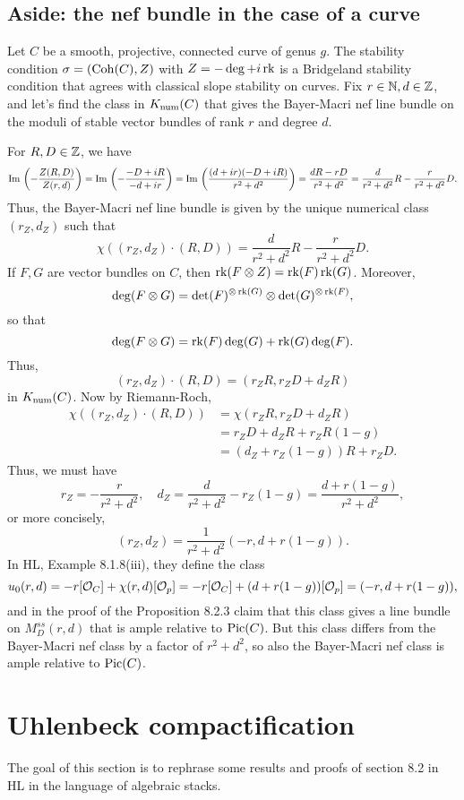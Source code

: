 \documentclass[letterpaper,10pt]{article}
\begin{document}
\subsection{Aside: the nef bundle in the case of a curve}
Let $C$ be a smooth, projective, connected curve of genus $g$. The stability condition $\sigma = (\mathrm{Coh}(C), Z)$ with $Z = -\deg + i\operatorname{\mathrm{rk}}$ is a Bridgeland stability condition that agrees with classical slope stability on curves. Fix $r \in \mathbb{N}, d \in \mathbb{Z}$, and let's find the class in $K_{\mathrm{num}}(C)$ that gives the Bayer-Macri nef line bundle on the moduli of stable vector bundles of rank $r$ and degree $d$.

For $R, D \in \mathbb{Z}$, we have
\[ \mathrm{Im}\,\left(-\frac{Z(R,D)}{Z(r,d)}\right) = \mathrm{Im}\,\left(-\frac{-D + i R}{-d + i r}\right) = \mathrm{Im}\,\left(\frac{(d + i r)(-D + i R)}{r^2 + d^2}\right) = \frac{d R - r D}{r^2 + d^2} = \frac{d}{r^2 + d^2} R - \frac{r}{r^2 + d^2} D. \]
Thus, the Bayer-Macri nef line bundle is given by the unique numerical class $(r_Z, d_Z)$ such that
\[ \chi((r_Z, d_Z) \cdot (R, D)) = \frac{d}{r^2 + d^2} R - \frac{r}{r^2 + d^2} D. \]
If $F, G$ are vector bundles on $C$, then $\operatorname{\mathrm{rk}}(F \otimes Z) = \operatorname{\mathrm{rk}}(F) \operatorname{\mathrm{rk}}(G)$. Moreover, 
\[ \deg(F \otimes G) = \det(F)^{\otimes \operatorname{\mathrm{rk}}(G)} \otimes \det(G)^{\otimes \operatorname{\mathrm{rk}}(F)}, \] 
so that 
\[ \deg(F \otimes G) = \operatorname{\mathrm{rk}}(F) \deg(G) + \operatorname{\mathrm{rk}}(G) \deg(F). \] 
Thus,
\[ (r_Z, d_Z) \cdot (R, D) = (r_Z R, r_Z D + d_Z R) \] 
in $K_{\mathrm{num}}(C)$. Now by Riemann-Roch,
\begin{align*}
    \chi((r_Z, d_Z)\cdot(R, D)) & = \chi(r_Z R, r_Z D + d_Z R) \\
    & = r_Z D + d_Z R + r_Z R (1 - g) \\
    & = (d_Z + r_Z (1 - g)) R + r_Z D.
\end{align*}
Thus, we must have 
\[ r_Z = -\frac{r}{r^2 + d^2}, \quad d_Z = \frac{d}{r^2 + d^2} - r_Z(1-g) = \frac{d + r(1-g)}{r^2 + d^2}, \]
or more concisely,
\[ (r_Z, d_Z) = \frac{1}{r^2 + d^2}(-r, d + r(1-g)). \]
In HL, Example 8.1.8(iii), they define the class 
\[ u_0(r,d) = - r [\mathcal{O}_C] + \chi(r,d) [\mathcal{O}_p] = -r [\mathcal{O}_C] + (d + r(1-g))[\mathcal{O}_p] = (-r, d + r(1-g)), \]
and in the proof of the Proposition 8.2.3 claim that this class gives a line bundle on $M_D^{ss}(r,d)$ that is ample relative to $\mathrm{Pic}(C)$. But this class differs from the Bayer-Macri nef class by a factor of $r^2 + d^2$, so also the Bayer-Macri nef class is ample relative to $\mathrm{Pic}(C)$.



\section{Uhlenbeck compactification}
The goal of this section is to rephrase some results and proofs of section 8.2 in HL in the language of algebraic stacks.
\end{document}
